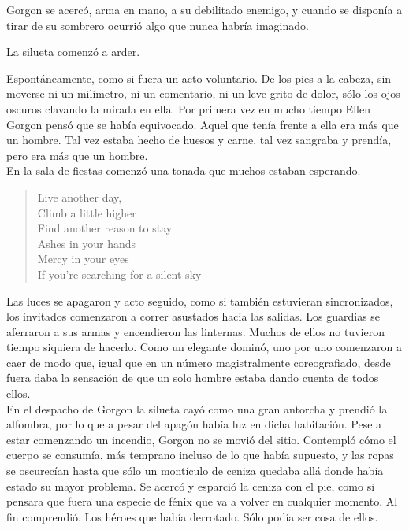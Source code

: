 Gorgon se acercó, arma en mano, a su debilitado enemigo, y cuando se disponía a tirar de su sombrero ocurrió algo que nunca habría imaginado.

La silueta comenzó a arder.

Espontáneamente, como si fuera un acto voluntario. De los pies a la cabeza, sin moverse ni un milímetro, ni un comentario, ni un leve grito de dolor, sólo los ojos oscuros clavando la mirada en ella. Por primera vez en mucho tiempo Ellen Gorgon pensó que se había equivocado. Aquel que tenía frente a ella era más que un hombre. Tal vez estaba hecho de huesos y carne, tal vez sangraba y prendía, pero era más que un hombre.\\

\noindent{}En la sala de fiestas comenzó una tonada que muchos estaban esperando.

\begin{verse}
    \begin{em}
        Live another day,\\
        Climb a little higher\\
        Find another reason to stay\\
        Ashes in your hands\\
        Mercy in your eyes\\
        If you're searching for a silent sky\\
    \end{em}
\end{verse}

Las luces se apagaron y acto seguido, como si también estuvieran sincronizados, los invitados comenzaron a correr asustados hacia las salidas. Los guardias se aferraron a sus armas y encendieron las linternas. Muchos de ellos no tuvieron tiempo siquiera de hacerlo. Como un elegante dominó, uno por uno comenzaron a caer de modo que, igual que en un número magistralmente coreografiado, desde fuera daba la sensación de que un solo hombre estaba dando cuenta de todos ellos.\\

\noindent{}En el despacho de Gorgon la silueta cayó como una gran antorcha y prendió la alfombra, por lo que a pesar del apagón había luz en dicha habitación. Pese a estar comenzando un incendio, Gorgon no se movió del sitio. Contempló cómo el cuerpo se consumía, más temprano incluso de lo que había supuesto, y las ropas se oscurecían hasta que sólo un montículo de ceniza quedaba allá donde había estado su mayor problema. Se acercó y esparció la ceniza con el pie, como si pensara que fuera una especie de fénix que va a volver en cualquier momento. Al fin comprendió. Los héroes que había derrotado. Sólo podía ser cosa de ellos.

